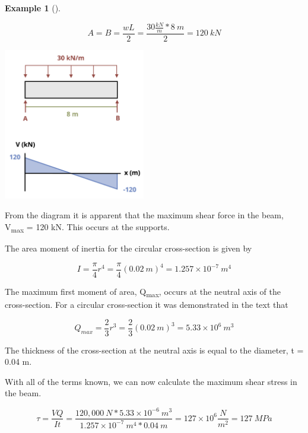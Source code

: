 \documentclass[
  letterpaper,
  DIV=11,
  numbers=noendperiod]{scrreprt}
\theoremstyle{definition}
\newtheorem{example}{Example}[chapter]
\theoremstyle{remark}
\begin{document}
\begin{tcolorbox}
\begin{example}[]
\begin{tcolorbox}
\[
A=B=\frac{w L}{2}=\frac{30\frac{kN}{m} * 8{~m}}{2}=120{~kN}
\]

\begin{center}
\includegraphics[width=2.4375in,height=\textheight]{images/CH10 PNGs/example 10.3 part 2.png}
\end{center}

From the diagram it is apparent that the maximum shear force in the
beam, V\textsubscript{max} = 120 kN. This occurs at the supports.

The area moment of inertia for the circular cross-section is given by

\[
I=\frac{\pi}{4} r^4=\frac{\pi}{4}(0.02{~m})^4=1.257 \times 10^{-7}{~m}^4
\]

The maximum first moment of area, Q\textsubscript{max}, occurs at the
neutral axis of the cross-section. For a circular cross-section it was
demonstrated in the text that

\[
Q_{max}=\frac{2}{3}r^3=\frac{2}{3}(0.02{~m})^3=5.33\times10^6{~m}^3
\]

The thickness of the cross-section at the neutral axis is equal to the
diameter, t = 0.04 m.

With all of the terms known, we can now calculate the maximum shear
stress in the beam.

\[
\tau=\frac{V Q}{I t}=\frac{120,000{~N} * 5.33 \times 10^{-6}{~m}^3}{1.257 \times 10^{-7}{~m}^4 * 0.04{~m}}=127\times10^6\frac{N}{m^2}=127{~MPa}
\]

\end{tcolorbox}

\end{example}

\end{tcolorbox}
\end{document}
